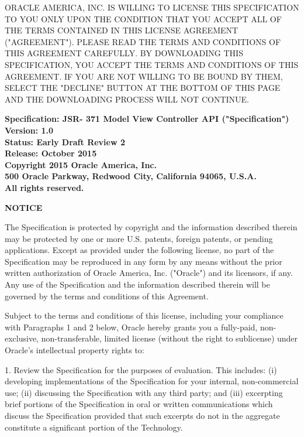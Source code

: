 \begin{flushleft}

\vspace{1em}

ORACLE AMERICA, INC. IS WILLING TO LICENSE THIS SPECIFICATION TO YOU ONLY UPON THE CONDITION THAT YOU ACCEPT ALL OF THE TERMS CONTAINED IN THIS LICENSE AGREEMENT ("AGREEMENT"). PLEASE READ THE TERMS AND CONDITIONS OF THIS AGREEMENT CAREFULLY. BY DOWNLOADING THIS SPECIFICATION, YOU ACCEPT THE TERMS AND CONDITIONS OF THIS AGREEMENT. IF YOU ARE NOT WILLING TO BE BOUND BY THEM, SELECT THE "DECLINE" BUTTON AT THE BOTTOM OF THIS PAGE AND THE DOWNLOADING PROCESS WILL NOT CONTINUE.

\vspace{1em}

{\bfseries
Specification: JSR- 371 Model View Controller API ("Specification") Version: 1.0 \\
Status: Early Draft Review 2 \\
Release: October 2015 \\
Copyright 2015 Oracle America, Inc. \\ 
500 Oracle Parkway, Redwood City, California 94065, U.S.A. \\
All rights reserved.\\
}

\vspace{1em}
{\bfseries NOTICE}

The Specification is protected by copyright and the information described therein may be protected by one or more U.S. patents, foreign patents, or pending applications. Except as provided under the following license, no part of the Specification may be reproduced in any form by any means without the prior written authorization of Oracle America, Inc. ("Oracle") and its licensors, if any. Any use of the Specification and the information described therein will be governed by the terms and conditions of this Agreement.

Subject to the terms and conditions of this license, including your compliance with Paragraphs 1 and 2 below, Oracle hereby grants you a fully-paid, non-exclusive, non-transferable, limited license (without the right to sublicense) under Oracle's intellectual property rights to:

1. Review the Specification for the purposes of evaluation. This includes: (i) developing implementations of the Specification for your internal, non-commercial use; (ii) discussing the Specification with any third party; and (iii) excerpting brief portions of the Specification in oral or written communications which discuss the Specification provided that such excerpts do not in the aggregate constitute a significant portion of the Technology.


\end{flushleft}

